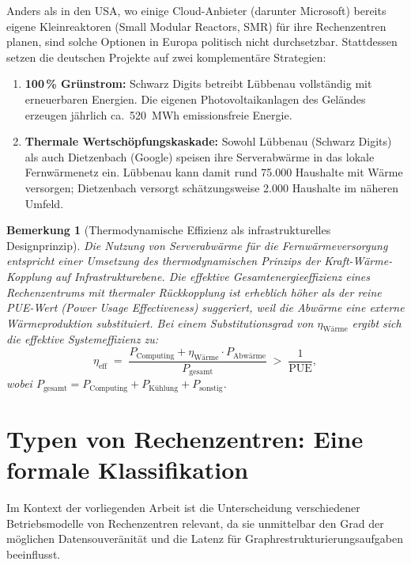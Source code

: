 \documentclass[12pt, a4paper, openany]{report}
\newtheorem{remark}[theorem]{Bemerkung}
\begin{document}
Anders als in den USA, wo einige Cloud-Anbieter (darunter Microsoft) bereits
eigene Kleinreaktoren (Small Modular Reactors, SMR) für ihre
Rechenzentren planen, sind solche Optionen in Europa politisch nicht
durchsetzbar. Stattdessen setzen die deutschen Projekte auf zwei
komplementäre Strategien:

\begin{enumerate}[label=(\arabic*)]
	\item \textbf{100\,\% Grünstrom:} Schwarz Digits betreibt Lübbenau
	vollständig mit erneuerbaren Energien. Die eigenen Photovoltaikanlagen
	des Geländes erzeugen jährlich ca.\ 520~MWh emissionsfreie Energie.
	\item \textbf{Thermale Wertschöpfungskaskade:} Sowohl Lübbenau (Schwarz
	Digits) als auch Dietzenbach (Google) speisen ihre Serverabwärme in
	das lokale Fernwärmenetz ein. Lübbenau kann damit rund 75.000 Haushalte
	mit Wärme versorgen; Dietzenbach versorgt schätzungsweise 2.000 Haushalte
	im näheren Umfeld.
\end{enumerate}

\begin{remark}[Thermodynamische Effizienz als infrastrukturelles Designprinzip]
	\label{rem:thermodynamik}
	Die Nutzung von Serverabwärme für die Fernwärmeversorgung entspricht einer
	Umsetzung des thermodynamischen Prinzips der Kraft-Wärme-Kopplung auf
	Infrastrukturebene. Die effektive Gesamtenergieeffizienz eines Rechenzentrums
	mit thermaler Rückkopplung ist erheblich höher als der reine
	PUE-Wert (Power Usage Effectiveness) suggeriert, weil die Abwärme eine
	externe Wärmeproduktion substituiert. Bei einem Substitutionsgrad von
	$\eta_{\text{Wärme}}$ ergibt sich die effektive Systemeffizienz zu:
	\[
	\eta_{\text{eff}}
	\;=\;
	\frac{P_{\text{Computing}} + \eta_{\text{Wärme}} \cdot P_{\text{Abwärme}}}
	{P_{\text{gesamt}}}
	\;>\; \frac{1}{\text{PUE}},
	\]
	wobei $P_{\text{gesamt}} = P_{\text{Computing}} + P_{\text{Kühlung}} + P_{\text{sonstig}}$.
\end{remark}

\section{Typen von Rechenzentren: Eine formale Klassifikation}
\label{sec:rz_typen}

Im Kontext der vorliegenden Arbeit ist die Unterscheidung verschiedener
Betriebsmodelle von Rechenzentren relevant, da sie unmittelbar den Grad
der möglichen Datensouveränität und die Latenz für Graphrestrukturierungsaufgaben
beeinflusst.
\end{document}
